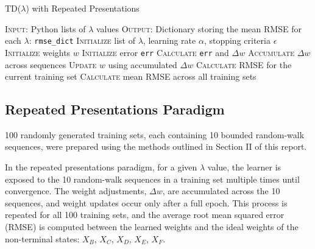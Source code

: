 \documentclass[lettersize,journal]{IEEEtran}
\begin{document}
\begin{algorithm}[H]
\caption{TD($\lambda$) with Repeated Presentations}\label{alg:td_lambda}
\begin{algorithmic}
    \STATE 
    \STATE \textsc{Input:} Python lists of $\lambda$ values
    \STATE \textsc{Output:} Dictionary storing the mean RMSE for each $\lambda$: \texttt{rmse\_dict}
    \STATE 
    \STATE \textsc{Initialize} list of $\lambda$, learning rate $\alpha$, stopping criteria $\epsilon$
            \STATE \textsc{Initialize} weights $w$
                    \STATE \textsc{Initialize} error \texttt{err}
                        \STATE \textsc{Calculate} \texttt{err} and $\Delta w$
                    \ENDFOR
                    \STATE \textsc{Accumulate} $\Delta w$ across sequences
                \ENDFOR
                \STATE \textsc{Update} $w$ using accumulated $\Delta w$
            \ENDWHILE
            \STATE \textsc{Calculate} RMSE for the current training set
        \ENDFOR
        \STATE \textsc{Calculate} mean RMSE across all training sets
    \ENDFOR
\end{algorithmic}
\label{alg:td_lambda}
\end{algorithm}

\subsection{Repeated Presentations Paradigm}

100 randomly generated training sets, each containing 10 bounded random-walk sequences, were prepared using the methods outlined in Section II of this report.

In the repeated presentations paradigm, for a given $\lambda$ value, the learner is exposed to the 10 random-walk sequences in a training set multiple times until convergence. The weight adjustments, $\Delta w$, are accumulated across the 10 sequences, and weight updates occur only after a full epoch. This process is repeated for all 100 training sets, and the average root mean squared error (RMSE) is computed between the learned weights and the ideal weights of the non-terminal states: $X_B$, $X_C$, $X_D$, $X_E$, $X_F$.
\end{document}

